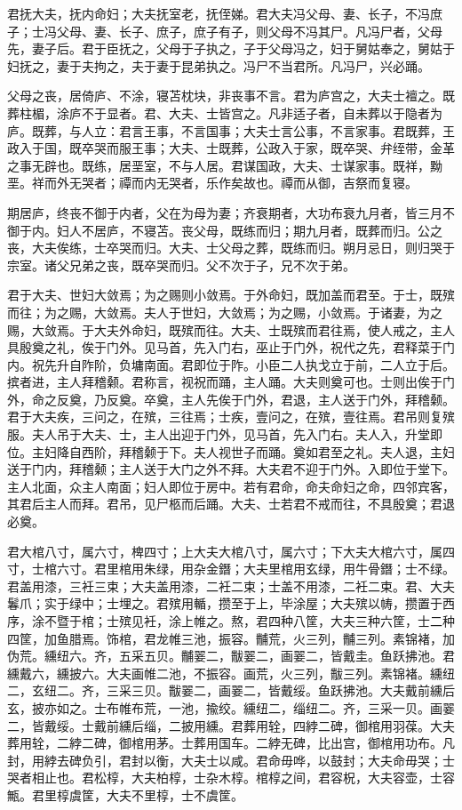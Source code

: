 \documentclass[]{article}
\begin{document}
君抚大夫，抚内命妇；大夫抚室老，抚侄娣。君大夫冯父母、妻、长子，不冯庶子；士冯父母、妻、长子、庶子，庶子有子，则父母不冯其尸。凡冯尸者，父母先，妻子后。君于臣抚之，父母于子执之，子于父母冯之，妇于舅姑奉之，舅姑于妇抚之，妻于夫拘之，夫于妻于昆弟执之。冯尸不当君所。凡冯尸，兴必踊。

父母之丧，居倚庐、不涂，寝苫枕块，非丧事不言。君为庐宫之，大夫士襢之。既葬柱楣，涂庐不于显者。君、大夫、士皆宫之。凡非适子者，自未葬以于隐者为庐。既葬，与人立：君言王事，不言国事；大夫士言公事，不言家事。君既葬，王政入于国，既卒哭而服王事；大夫、士既葬，公政入于家，既卒哭、弁绖带，金革之事无辟也。既练，居垩室，不与人居。君谋国政，大夫、士谋家事。既祥，黝垩。祥而外无哭者；禫而内无哭者，乐作矣故也。禫而从御，吉祭而复寝。

期居庐，终丧不御于内者，父在为母为妻；齐衰期者，大功布衰九月者，皆三月不御于内。妇人不居庐，不寝苫。丧父母，既练而归；期九月者，既葬而归。公之丧，大夫俟练，士卒哭而归。大夫、士父母之葬，既练而归。朔月忌日，则归哭于宗室。诸父兄弟之丧，既卒哭而归。父不次于子，兄不次于弟。

君于大夫、世妇大敛焉；为之赐则小敛焉。于外命妇，既加盖而君至。于士，既殡而往；为之赐，大敛焉。夫人于世妇，大敛焉；为之赐，小敛焉。于诸妻，为之赐，大敛焉。于大夫外命妇，既殡而往。大夫、士既殡而君往焉，使人戒之，主人具殷奠之礼，俟于门外。见马首，先入门右，巫止于门外，祝代之先，君释菜于门内。祝先升自阼阶，负墉南面。君即位于阼。小臣二人执戈立于前，二人立于后。摈者进，主人拜稽颡。君称言，视祝而踊，主人踊。大夫则奠可也。士则出俟于门外，命之反奠，乃反奠。卒奠，主人先俟于门外，君退，主人送于门外，拜稽颡。君于大夫疾，三问之，在殡，三往焉；士疾，壹问之，在殡，壹往焉。君吊则复殡服。夫人吊于大夫、士，主人出迎于门外，见马首，先入门右。夫人入，升堂即位。主妇降自西阶，拜稽颡于下。夫人视世子而踊。奠如君至之礼。夫人退，主妇送于门内，拜稽颡；主人送于大门之外不拜。大夫君不迎于门外。入即位于堂下。主人北面，众主人南面；妇人即位于房中。若有君命，命夫命妇之命，四邻宾客，其君后主人而拜。君吊，见尸柩而后踊。大夫、士若君不戒而往，不具殷奠；君退必奠。

君大棺八寸，属六寸，椑四寸；上大夫大棺八寸，属六寸；下大夫大棺六寸，属四寸，士棺六寸。君里棺用朱绿，用杂金鐕；大夫里棺用玄绿，用牛骨鐕；士不绿。君盖用漆，三衽三束；大夫盖用漆，二衽二束；士盖不用漆，二衽二束。君、大夫鬊爪；实于绿中；士埋之。君殡用輴，攒至于上，毕涂屋；大夫殡以帱，攒置于西序，涂不暨于棺；士殡见衽，涂上帷之。熬，君四种八筐，大夫三种六筐，士二种四筐，加鱼腊焉。饰棺，君龙帷三池，振容。黼荒，火三列，黼三列。素锦褚，加伪荒。纁纽六。齐，五采五贝。黼翣二，黻翣二，画翣二，皆戴圭。鱼跃拂池。君纁戴六，纁披六。大夫画帷二池，不振容。画荒，火三列，黻三列。素锦褚。纁纽二，玄纽二。齐，三采三贝。黻翣二，画翣二，皆戴绥。鱼跃拂池。大夫戴前纁后玄，披亦如之。士布帷布荒，一池，揄绞。纁纽二，缁纽二。齐，三采一贝。画翣二，皆戴绥。士戴前纁后缁，二披用纁。君葬用辁，四綍二碑，御棺用羽葆。大夫葬用辁，二綍二碑，御棺用茅。士葬用国车。二綍无碑，比出宫，御棺用功布。凡封，用綍去碑负引，君封以衡，大夫士以咸。君命毋哗，以鼓封；大夫命毋哭；士哭者相止也。君松椁，大夫柏椁，士杂木椁。棺椁之间，君容柷，大夫容壶，士容甒。君里椁虞筐，大夫不里椁，士不虞筐。
\end{document}
